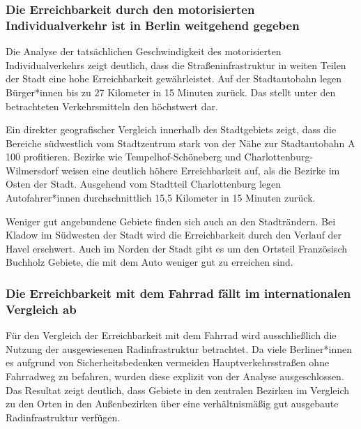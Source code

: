 
\subsubsection{Die Erreichbarkeit durch den motorisierten Individualverkehr ist in Berlin weitgehend gegeben}

Die Analyse der tatsächlichen Geschwindigkeit des motorisierten Individualverkehrs zeigt deutlich, dass die Straßeninfrastruktur in weiten Teilen der Stadt eine hohe Erreichbarkeit gewährleistet. Auf der Stadtautobahn legen Bürger*innen bis zu 27 Kilometer in 15 Minuten zurück. Das stellt unter den betrachteten Verkehrsmitteln den höchstwert dar.


Ein direkter geografischer Vergleich innerhalb des Stadtgebiets zeigt, dass die Bereiche südwestlich vom Stadtzentrum stark von der Nähe zur Stadtautobahn A 100 profitieren. Bezirke wie Tempelhof-Schöneberg und Charlottenburg-Wilmersdorf weisen eine deutlich höhere Erreichbarkeit auf, als die Bezirke im Osten der Stadt. Ausgehend vom Stadtteil Charlottenburg legen Autofahrer*innen durchschnittlich 15,5 Kilometer in 15 Minuten zurück.

Weniger gut angebundene Gebiete finden sich auch an den Stadträndern. Bei Kladow im Südwesten der Stadt wird die Erreichbarkeit durch den Verlauf der Havel erschwert. Auch im Norden der Stadt gibt es um den Ortsteil Französisch Buchholz Gebiete, die mit dem Auto weniger gut zu erreichen sind.

\subsubsection{Die Erreichbarkeit mit dem Fahrrad fällt im internationalen Vergleich ab}

Für den Vergleich der Erreichbarkeit mit dem Fahrrad wird ausschließlich die Nutzung der ausgewiesenen Radinfrastruktur betrachtet. Da viele Berliner*innen es aufgrund von Sicherheitsbedenken vermeiden Hauptverkehrsstraßen ohne Fahrradweg zu befahren, wurden diese explizit von der Analyse ausgeschlossen. Das Resultat zeigt deutlich, dass Gebiete in den zentralen Bezirken im Vergleich zu den Orten in den Außenbezirken über eine verhältnismäßig gut ausgebaute Radinfrastruktur verfügen.

